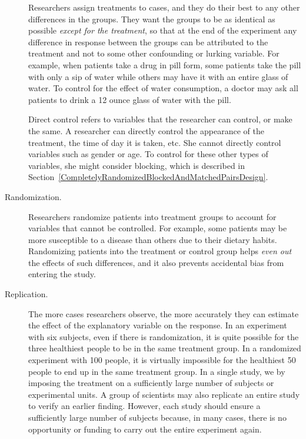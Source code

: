 \begin{description}
\item[] Researchers assign treatments to cases, and they do their best to  any other differences in the groups. They want the groups to be as identical as possible \emph{except for the treatment}, so that at the end of the experiment any difference in response between the groups can be attributed to the treatment and not to some other confounding or lurking variable. For example, when patients take a drug in pill form, some patients take the pill with only a sip of water while others may have it with an entire glass of water. To control for the effect of water consumption, a doctor may ask all patients to drink a 12 ounce glass of water with the pill.

Direct control refers to variables that the researcher can control, or make the same. A researcher can directly control the appearance of the treatment, the time of day it is taken, etc. She cannot directly control variables such as gender or age. To control for these other types of variables, she might consider blocking, which is described in Section~\ref{CompletelyRandomizedBlockedAndMatchedPairsDesign}.

\item[Randomization.] Researchers randomize patients into treatment groups to account for variables that cannot be controlled. For example, some patients may be more susceptible to a disease than others due to their dietary habits. Randomizing patients into the treatment or control group helps \emph{even out} the effects of such differences, and it also prevents accidental bias from entering the study.

\item[Replication.] The more cases researchers observe, the more accurately they can estimate the effect of the explanatory variable on the response. In an experiment with six subjects, even if there is randomization, it is quite possible for the three healthiest people to be in the same treatment group. In a randomized experiment with 100 people, it is virtually impossible for the healthiest 50 people to end up in the same treatment group. In a single study, we  by imposing the treatment on a sufficiently large number of subjects or experimental units. A group of scientists may also replicate an entire study to verify an earlier finding. However, each study should ensure a sufficiently large number of subjects because, in many cases, there is no opportunity or funding to carry out the entire experiment again.
\end{description}

